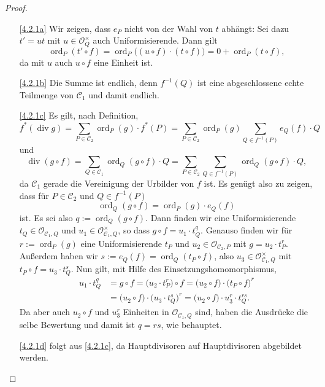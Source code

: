 \documentclass[a4paper,12pt,index=toc]{scrbook}
\theoremstyle{keinenummern} %
\def\CC{\mathcal{C}}
\def\O{\mathcal{O}}
\renewcommand{\div}{\operatorname{div}}
\newcommand{\ord}{\operatorname{ord}}
\begin{document}
\begin{proof}\begin{enumerate}
\item[\ref{4.2.1a}] Wir zeigen, dass $e_{P}$ nicht von der Wahl von $t$ abhängt: Sei dazu $t'=ut$ mit $u\in\O_{Q}^{\times}$ auch Uniformisierende. Dann gilt
\begin{equation*}\ord_{P}(t'\circ f)=\ord_{P}\bigl((u\circ f)\cdot(t\circ f)\bigr)=0+\ord_{P}(t\circ f),\end{equation*}
da mit $u$ auch $u\circ f$ eine Einheit ist.
\item[\ref{4.2.1b}] Die Summe ist endlich, denn $f^{-1}(Q)$ ist eine abgeschlossene echte Teilmenge von $\CC_{1}$ und damit endlich.
\item[\ref{4.2.1c}] Es gilt, nach Definition,
\begin{equation*}f^{*}(\div g)=\sum_{P\in\CC_{2}}\ord_{P}(g)\cdot f^{*}(P)=\sum_{P\in\CC_{2}}\ord_{P}(g)\sum_{Q\in f^{-1}(P)}e_{Q}(f)\cdot Q\end{equation*}
und
\begin{equation*}\div(g\circ f)=\sum_{Q\in\CC_{1}}\ord_{Q}(g\circ f)\cdot Q=\sum_{P\in\CC_{2}}\sum_{Q\in f^{-1}(P)}\ord_{Q}(g\circ f)\cdot Q,\end{equation*}
da $\CC_{1}$ gerade die Vereinigung der Urbilder von $f$ ist. Es genügt also zu zeigen, dass für $P\in\CC_{2}$ und $Q\in f^{-1}(P)$
\begin{equation*}\ord_{Q}(g\circ f)=\ord_{P}(g)\cdot e_{Q}(f)\end{equation*}
ist. Es sei also $q:=\ord_{Q}(g\circ f)$. Dann finden wir eine Uniformisierende $t_{Q}\in\O_{\CC_{1},Q}$ und $u_{1}\in\O_{\CC_{1},Q}^{\times}$, so dass $g\circ f=u_{1}\cdot t_{Q}^{q}$. Genauso finden wir für $r:=\ord_{P}(g)$ eine Uniformisierende $t_{P}$ und $u_{2}\in\O_{\CC_{2},P}$ mit $g=u_{2}\cdot t_{P}^{r}$. Außerdem haben wir $s:=e_{Q}(f)=\ord_{Q}(t_{P}\circ f)$, also $u_{3}\in\O_{\CC_{1},Q}^{\times}$ mit $t_{P}\circ f=u_{3}\cdot t_{Q}^{s}$. Nun gilt, mit Hilfe des Einsetzungshomomorphismus,
\begin{align*}
u_{1}\cdot t_{Q}^{q}&=g\circ f = \bigl(u_{2}\cdot t_{P}^{r}\bigr)\circ f=\bigl(u_{2}\circ f\bigr)\cdot \bigl(t_{P}\circ f)^{r}\\
&=\bigl(u_{2}\circ f\bigr)\cdot \bigl(u_{3}\cdot t_{Q}^{s}\bigr)^{r}=\bigl(u_{2}\circ f\bigr)\cdot u_{3}^{r}\cdot t_{Q}^{rs}.
\end{align*}
Da aber auch $u_{2}\circ f$ und $u_{3}^{r}$ Einheiten in $\O_{\CC_{1},Q}$ sind, haben die Ausdrücke die selbe Bewertung und damit ist $q=rs$, wie behauptet.
\item[\ref{4.2.1d}] folgt aus \ref{4.2.1c}, da Hauptdivisoren auf Hauptdivisoren abgebildet werden.
\end{enumerate}\end{proof}
\end{document}
